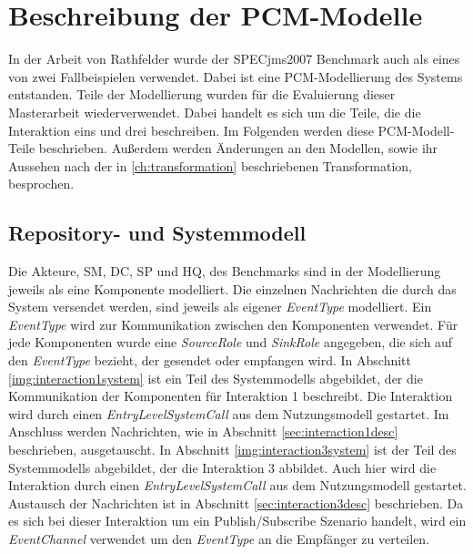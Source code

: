\section{Beschreibung der PCM-Modelle}
\label{sec:specjmsmodell}
In der Arbeit von Rathfelder \cite{Rathfelder2013} wurde der SPECjms2007 Benchmark auch als eines von zwei Fallbeispielen verwendet. Dabei ist eine PCM-Modellierung des Systems entstanden. Teile der Modellierung wurden für die Evaluierung dieser Masterarbeit wiederverwendet. Dabei handelt es sich um die Teile, die die Interaktion eins und drei beschreiben. Im Folgenden werden diese PCM-Modell-Teile beschrieben. Außerdem werden Änderungen an den Modellen, sowie ihr Aussehen nach der in \autoref{ch:transformation} beschriebenen Transformation, besprochen. 

\subsection{Repository- und Systemmodell}
Die Akteure, SM, DC, SP und HQ, des Benchmarks sind in der Modellierung jeweils als eine Komponente modelliert. Die einzelnen Nachrichten die durch das System versendet werden, sind jeweils als eigener \emph{EventType} modelliert. Ein \emph{EventType} wird zur Kommunikation zwischen den Komponenten verwendet. Für jede Komponenten wurde eine \emph{SourceRole} und \emph{SinkRole} angegeben, die sich auf den \emph{EventType} bezieht, der gesendet oder empfangen wird. In Abschnitt \ref{img:interaction1system} ist ein Teil des Systemmodells abgebildet, der die Kommunikation der Komponenten für Interaktion 1 beschreibt. Die Interaktion wird durch einen \emph{EntryLevelSystemCall} aus dem Nutzungsmodell gestartet. Im Anschluss werden Nachrichten, wie in Abschnitt \ref{sec:interaction1desc} beschrieben, ausgetauscht. In Abschnitt \ref{img:interaction3system} ist der Teil des Systemmodells abgebildet, der die Interaktion 3 abbildet. Auch hier wird die Interaktion durch einen \emph{EntryLevelSystemCall} aus dem Nutzungsmodell gestartet. Austausch der Nachrichten ist in Abschnitt \ref{sec:interaction3desc} beschrieben. Da es sich bei dieser Interaktion um ein Publish/Subscribe Szenario handelt, wird ein \emph{EventChannel} verwendet um den \emph{EventType} an die Empfänger zu verteilen.


